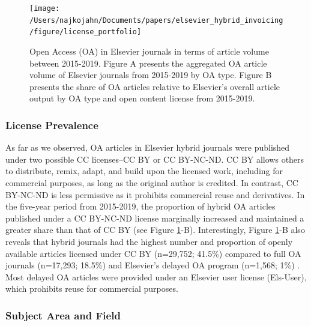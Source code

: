 \documentclass[a4paper,man,floatsintext,longtable,noextraspace,12pt]{apa6}
\begin{document}
\begin{figure}[H]

{\centering \texttt{[image: /Users/najkojahn/Documents/papers/elsevier\_hybrid\_invoicing/figure/license\_portfolio]} 

}

\caption{Open Access (OA) in Elsevier journals in terms of article volume between 2015-2019. Figure A presents the aggregated OA article volume of Elsevier journals from 2015-2019 by OA type. Figure B presents the share of OA articles relative to Elsevier's overall article output by OA type and open content license from 2015-2019.}\label{fig:oa_volume_fig}
\end{figure}

\hypertarget{license-prevalence}{%
\subsubsection*{License Prevalence}\label{license-prevalence}}

As far as we observed, OA articles in Elsevier hybrid journals were
published under two possible CC licenses--CC BY or CC BY-NC-ND. CC BY
allows others to distribute, remix, adapt, and build upon the licensed
work, including for commercial purposes, as long as the original author
is credited. In contrast, CC BY-NC-ND is less permissive as it prohibits
commercial reuse and derivatives. In the five-year period from
2015-2019, the proportion of hybrid OA articles published under a CC
BY-NC-ND license marginally increased and maintained a greater share
than that of CC BY (see Figure \ref{fig:oa_volume_fig}-B).
Interestingly, Figure \ref{fig:oa_volume_fig}-B also reveals that hybrid
journals had the highest number and proportion of openly available
articles licensed under CC BY (n=29,752; 41.5\%) compared to full OA
journals (n=17,293; 18.5\%) and Elsevier's delayed OA program (n=1,568;
1\%) . Most delayed OA articles were provided under an Elsevier user
license (Els-User), which prohibits reuse for commercial purposes.

\hypertarget{subject-area-and-field}{%
\subsubsection*{Subject Area and Field}\label{subject-area-and-field}}
\end{document}

